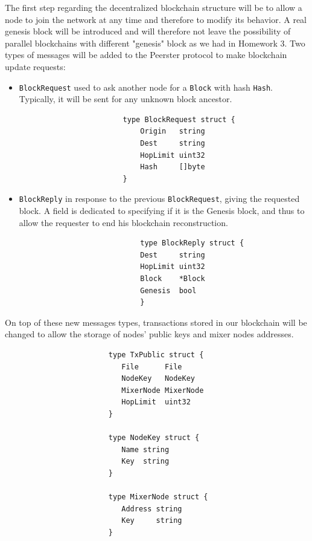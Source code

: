 \documentclass[11pt, a4paper]{article}
\begin{document}
            The first step regarding the decentralized blockchain structure will be to allow a node to join the network at any time and therefore to modify its behavior.
            A real genesis block will be introduced and will therefore not leave the possibility of parallel blockchains with different "genesis" block as we had in Homework 3.
            \bigbreak
            Two types of messages will be added to the Peerster protocol to make blockchain update requests:
            \begin{itemize}
                \item \texttt{BlockRequest} used to ask another node for a \texttt{Block} with hash \texttt{Hash}. Typically, it will be sent for any unknown block ancestor.
                    \begin{lstlisting}
                        type BlockRequest struct {
                            Origin   string
                            Dest     string
                            HopLimit uint32
                            Hash     []byte
                        }
                    \end{lstlisting}

                \item \texttt{BlockReply} in response to the previous \texttt{BlockRequest}, giving the requested block.
                A field is dedicated to specifying if it is the Genesis block, and thus to allow the requester to end his blockchain reconstruction.
                        \begin{lstlisting}
                            type BlockReply struct {
                            Dest     string
                            HopLimit uint32
                            Block    *Block
                            Genesis  bool
                            }
                        \end{lstlisting}
            \end{itemize}

            On top of these new messages types, transactions stored in our blockchain will be changed to allow the storage of nodes' public keys and mixer nodes addresses.
                \begin{lstlisting}
                        type TxPublic struct {
                           File      File
                           NodeKey   NodeKey
                           MixerNode MixerNode
                           HopLimit  uint32
                        }

                        type NodeKey struct {
                           Name string
                           Key  string
                        }

                        type MixerNode struct {
                           Address string
                           Key     string
                        }
                \end{lstlisting}
\end{document}
